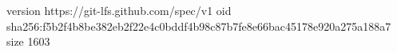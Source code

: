 version https://git-lfs.github.com/spec/v1
oid sha256:f5b2f4b8be382eb2f22e4c0bddf4b98c87b7fe8e66bac45178e920a275a188a7
size 1603
